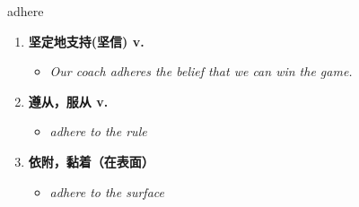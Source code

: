 
\begin{frame}
{\huge adhere}
\begin{center}
\begin{enumerate}\Large
  \item \textbf{坚定地支持(坚信) v.}
  \begin{itemize}
    \item \em{\Large{Our coach adheres the belief that we can win the game.}}
  \end{itemize}
  \item \textbf{遵从，服从 v.}
  \begin{itemize}
    \item \em{\Large{adhere to the rule}}
  \end{itemize}
  \item \textbf{依附，黏着（在表面）}
  \begin{itemize}
    \item \em{\Large{adhere to the surface}}
  \end{itemize}
\end{enumerate}
\end{center}
\end{frame}
